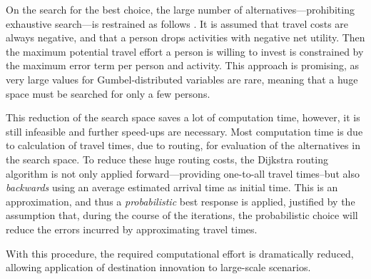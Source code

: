On the search for the best choice, the large number of alternatives---prohibiting exhaustive search---is restrained as follows \citet[for the detailed derivation see][p.51 ff.]{Horni_PhDThesis_2013}. It is assumed that travel costs are always negative, and that a person drops activities with negative net utility. Then the maximum potential travel effort a person is willing to invest is constrained by the maximum error term per person and activity. This approach is promising, as very large values for Gumbel-distributed variables are rare, meaning that a huge space must be searched for only a few persons. 

This reduction of the search space saves a lot of computation time, however, it is still infeasible and further speed-ups are necessary. Most computation time is due to calculation of travel times, \ie due to routing, for evaluation of the alternatives in the search space. To reduce these huge routing costs, the Dijkstra \citep[][]{Dijkstra_NM_1959}
routing algorithm is not only applied forward---providing one-to-all travel times--but also \emph{backwards} using an average estimated arrival time as initial time. This is an approximation, and thus a \emph{probabilistic} best response is applied, justified by the 
assumption that, during the course of the iterations, the probabilistic choice 
will reduce
the errors incurred by approximating travel times. 

With this procedure, the required computational effort is dramatically reduced, allowing application of destination innovation to large-scale scenarios.

